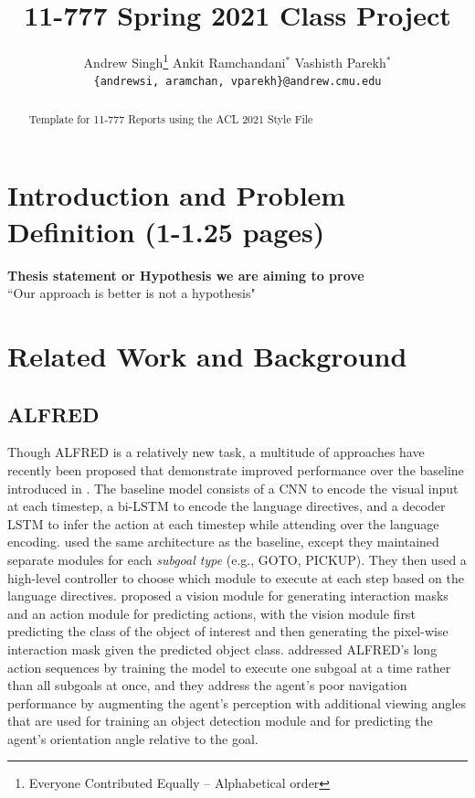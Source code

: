\documentclass[11pt,a4paper]{article}
\title{11-777 Spring 2021 Class Project}
\author{
  Andrew Singh\thanks{\hspace{4pt}Everyone Contributed Equally -- Alphabetical order} \hspace{2em} Ankit Ramchandani$^*$ \hspace{2em} Vashisth Parekh$^*$ \\
  \texttt{\{andrewsi, aramchan, vparekh\}@andrew.cmu.edu}
  }
\date{}
\begin{document}
\maketitle
\begin{abstract}
Template for 11-777 Reports using the ACL 2021 Style File 
\end{abstract}

\section{Introduction and Problem Definition (1-1.25 pages)}
\textbf{Thesis statement or Hypothesis we are aiming to prove}\\
``Our approach is better is not a hypothesis"

\clearpage
\section{Related Work and Background}
\label{sec:rel-work}
\subsection{ALFRED}
\label{ssec:alf}
Though ALFRED is a relatively new task, a multitude of approaches have recently been proposed that demonstrate improved performance over the baseline introduced in \cite{shridhar2020alfred}. The baseline model consists of a CNN to encode the visual input at each timestep, a bi-LSTM to encode the language directives, and a decoder LSTM to infer the action at each timestep while attending over the language encoding. \cite{corona2020modularity} used the same architecture as the baseline, except they maintained separate modules for each \emph{subgoal type} (e.g., GOTO, PICKUP). They then used a high-level controller to choose which module to execute at each step based on the language directives. \cite{singh2020moca} proposed a vision module for generating interaction masks and an action module for predicting actions, with the vision module first predicting the class of the object of interest and then generating the pixel-wise interaction mask given the predicted object class. \cite{Storks2021AreWT} addressed ALFRED's long action sequences by training the model to execute one subgoal at a time rather than all subgoals at once, and they address the agent's poor navigation performance by augmenting the agent's perception with additional viewing angles that are used for training an object detection module and for predicting the agent's orientation angle relative to the goal.
\end{document}
